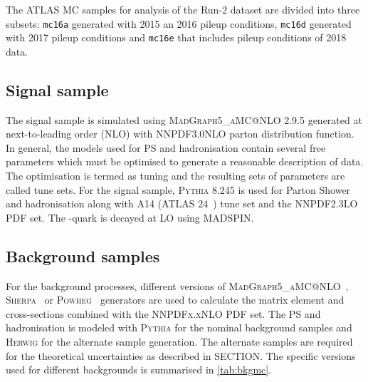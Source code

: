 The ATLAS MC samples for analysis of the Run-2 dataset are divided into three subsets: 
\texttt{mc16a} generated with 2015 an 2016 pileup conditions, \texttt{mc16d} generated with 
2017 pileup conditions and \texttt{mc16e} that includes pileup conditions of 2018 data. 

\subsection{Signal sample}
The \tZq signal sample is simulated using \textsc{MadGraph5\_aMC@NLO} 2.9.5 generated at next-to-leading
order (NLO) with \textsc{NNPDF3.0NLO} parton distribution function. In general, the models used for
PS and hadronisation contain several free parameters which must be optimised to generate a reasonable
description of data. The optimisation is termed as tuning and the resulting sets of parameters are called
tune sets. For the signal sample, \textsc{Pythia} 8.245 is used for Parton Shower and
hadronisation along with A14 (ATLAS 24~\cite{ATL-PHYS-PUB-2014-021}) tune set and the \textsc{NNPDF2.3LO} PDF set.
The \Ptop-quark is decayed at LO using \textsc{MADSPIN}.

\subsection{Background samples}
For the background processes, different versions of \textsc{MadGraph5\_aMC@NLO}~\cite{Alwall:2014hca}, 
\textsc{Sherpa}~\cite{TGleisberg_2009} or \textsc{Powheg}~\cite{Banfi:2023mhz} generators are used to
calculate the matrix element and cross-sections combined with the \textsc{NNPDFx.xNLO} PDF set.
The PS and hadronisation is modeled with \textsc{Pythia} for the nominal background samples
and \textsc{Herwig} for the alternate sample generation. The alternate samples are required
for the theoretical uncertainties as described in SECTION. The specific versions
used for different backgrounds is summarised in \cref{tab:bkgmc}.


